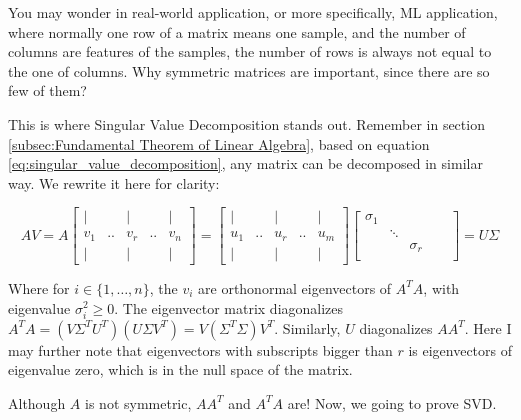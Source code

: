 \documentclass[a4paper]{book}
\begin{document}
      You may wonder in real-world application, or more specifically, ML
      application, where normally one row of a matrix means one sample,
      and the number of columns are features of the samples, the number
      of rows is always not equal to the one of columns. Why symmetric
      matrices are important, since there are so few of them?

      This is where Singular Value Decomposition stands out. Remember in
      section \ref{subsec:Fundamental Theorem of Linear Algebra}, based
      on equation \ref{eq:singular_value_decomposition}, any matrix can
      be decomposed in similar way. We rewrite it here for clarity:

      \begin{displaymath}
        AV = A
        \begin{bmatrix}
            |   &    &   |   &    &   |  \\
          v_{1} & .. & v_{r} & .. & v_{n}\\
            |   &    &   |   &    &   |  
        \end{bmatrix}
        =
        \begin{bmatrix}
            |   &    &   |   &    &   |  \\
          u_{1} & .. & u_{r} & .. & u_{m}\\
            |   &    &   |   &    &   |  
        \end{bmatrix}
        \begin{bmatrix}
          \sigma_{1}  &         &       &    &      \\
                      & \ddots  &       &    &      \\
                      &         & \sigma_{r} &    & \\
                      &         &            &    & 
        \end{bmatrix}
        = U\Sigma
      \end{displaymath}

      Where for $i \in \{1, \ldots , n\}$, the $v_i$ are orthonormal eigenvectors
      of $A^{T}A$, with eigenvalue $\sigma_{i}^{2} \geq 0$. The
      eigenvector matrix diagonalizes $A^{T}A =
      (V\Sigma^{T}U^{T})(U\Sigma V^{T}) = V(\Sigma^{T}\Sigma)V^{T}$.
      Similarly, $U$ diagonalizes $AA^{T}$. Here I may further note that
      eigenvectors with subscripts bigger than $r$ is eigenvectors of
      eigenvalue zero, which is in the null space of the matrix.

      Although $A$ is not symmetric, $AA^{T}$ and $A^{T}A$ are! Now, we
      going to prove SVD\cite{strang2009introduction}.
\end{document}
